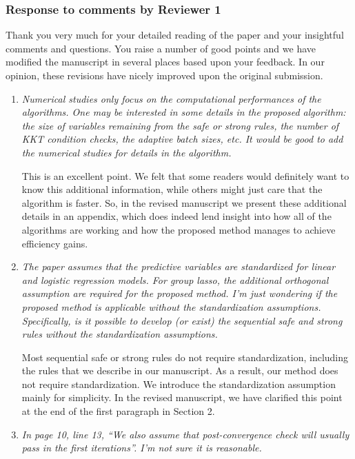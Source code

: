 \documentclass{article}
\begin{document}
\subsubsection*{Response to comments by Reviewer 1}

Thank you very much for your detailed reading of the paper and your insightful comments and questions. You raise a number of good points and we have modified the manuscript in several places based upon your feedback.  In our opinion, these revisions have nicely improved upon the original submission.

\begin{enumerate}

\item \emph{Numerical studies only focus on the computational performances of the algorithms. One may be interested in some details in the proposed algorithm: the size of variables remaining from the safe or strong rules, the number of KKT condition checks, the adaptive batch sizes, etc. It would be good to add the numerical studies for details in the algorithm.}

  This is an excellent point. We felt that some readers would definitely want to know this additional information, while others might just care that the algorithm is faster. So, in the revised manuscript we present these additional details in an appendix, which does indeed lend insight into how all of the algorithms are working and how the proposed method manages to achieve efficiency gains.

\item \emph{The paper assumes that the predictive variables are standardized for linear and logistic regression models. For group lasso, the additional orthogonal assumption are required for the proposed method. I’m just wondering if the proposed method is applicable without the standardization assumptions. Specifically, is it possible to develop (or exist) the sequential safe and strong rules without the standardization assumptions.}

  Most sequential safe or strong rules do not require standardization, including the rules that we describe in our manuscript. As a result, our method does not require standardization. We introduce the standardization assumption mainly for simplicity. In the revised manuscript, we have clarified this point at the end of the first paragraph in Section 2.

\item \emph{In page 10, line 13, ``We also assume that post-convergence check will usually pass in the first iterations''. I’m not sure it is reasonable.}


\end{enumerate}
\end{document}

